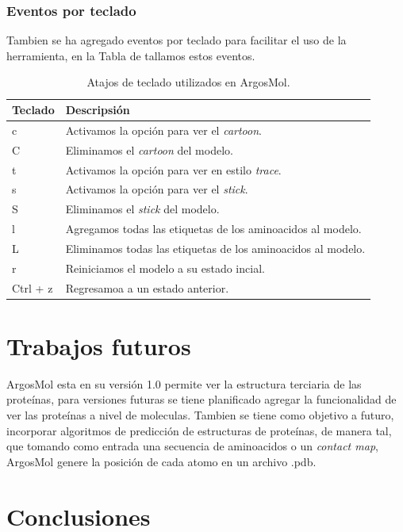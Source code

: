 \documentclass{article}
\begin{document}
\subsubsection{Eventos por teclado}

Tambien se ha agregado eventos por teclado para facilitar el uso de la herramienta, en la Tabla de tallamos estos eventos.

\begin{table}[H]
	
	\begin{tabular}{p{2.1cm} p{12.6cm}}
		\textbf{Teclado} & \textbf{Descripsión}   \\
		\hline 
		c & Activamos la opción para ver el \textit{cartoon}. \\
		C & Eliminamos el \textit{cartoon} del modelo. \\
		t & Activamos la opción para ver en estilo \textit{trace}. \\
		s & Activamos la opción para ver el \textit{stick}. \\ 
		S & Eliminamos el \textit{stick} del modelo. \\
		l & Agregamos todas las etiquetas de los aminoacidos al modelo. \\
		L & Eliminamos todas las etiquetas de los aminoacidos al modelo. \\
		r & Reiniciamos el modelo a su estado incial. \\
		Ctrl + z & Regresamoa a un estado anterior. \\
		\hline
	\end{tabular}
	\caption{Atajos de teclado utilizados en ArgosMol.}
	\label{tab:tecalado}
\end{table}	
	
\section{Trabajos futuros}
ArgosMol esta en su versión 1.0 permite ver la estructura terciaria de las proteínas, para versiones futuras se tiene planificado agregar la funcionalidad de ver las proteínas a nivel de moleculas. Tambien se tiene como objetivo a futuro, incorporar algoritmos de predicción de estructuras de proteínas, de manera tal, que tomando como entrada una secuencia de aminoacidos o un \textit{contact map}, ArgosMol genere la posición de cada atomo en un archivo .pdb.

\section{Conclusiones}
\end{document}
